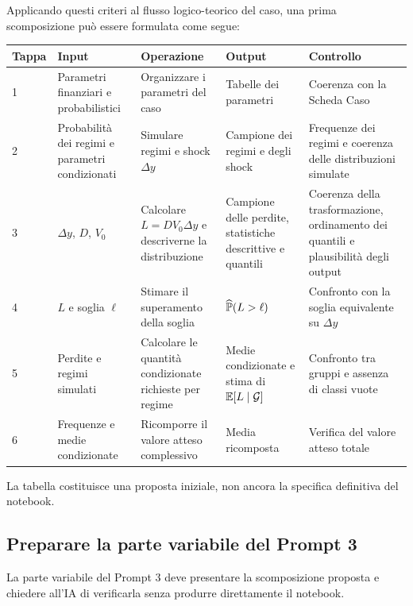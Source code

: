 Applicando questi criteri al flusso logico-teorico del caso, una prima scomposizione
pu\`{o} essere formulata come segue:

\begin{center}
\small
\begin{tabular}{p{0.9cm}p{2.4cm}p{3.0cm}p{3.0cm}p{3.0cm}}
\textbf{Tappa} &
\textbf{Input} &
\textbf{Operazione} &
\textbf{Output} &
\textbf{Controllo}
\\ \hline

1 &
Parametri finanziari e probabilistici &
Organizzare i parametri del caso &
Tabelle dei parametri &
Coerenza con la Scheda Caso
\\

2 &
Probabilit\`{a} dei regimi e parametri condizionati &
Simulare regimi e shock $\Delta y$ &
Campione dei regimi e degli shock &
Frequenze dei regimi e coerenza delle distribuzioni simulate
\\

3 &
$\Delta y$, $D$, $V_0$ &
Calcolare $L=D V_0\Delta y$ e descriverne la distribuzione &
Campione delle perdite, statistiche descrittive e quantili &
Coerenza della trasformazione, ordinamento dei quantili e plausibilit\`{a}
degli output
\\

4 &
$L$ e soglia $\ell$ &
Stimare il superamento della soglia &
$\widehat{\mathbb{P}}(L>\ell)$ &
Confronto con la soglia equivalente su $\Delta y$
\\

5 &
Perdite e regimi simulati &
Calcolare le quantit\`{a} condizionate richieste per regime &
Medie condizionate e stima di $\mathbb{E}[L\mid\mathcal{G}]$ &
Confronto tra gruppi e assenza di classi vuote
\\

6 &
Frequenze e medie condizionate &
Ricomporre il valore atteso complessivo &
Media ricomposta &
Verifica del valore atteso totale
\end{tabular}
\end{center}

La tabella costituisce una proposta iniziale, non ancora la specifica
definitiva del notebook.

\subsection{Preparare la parte variabile del Prompt 3}

La parte variabile del Prompt 3 deve presentare la scomposizione proposta e
chiedere all'IA di verificarla senza produrre direttamente il notebook.

